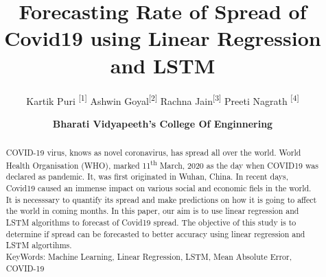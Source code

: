 \documentclass[a4paper]{jpconf}
\begin{document}
\title{Forecasting Rate of Spread of Covid19 using Linear Regression and LSTM}

\author{Kartik Puri \textsuperscript{[1]}
Ashwin Goyal\textsuperscript{[2]}
Rachna Jain\textsuperscript{[3]}
Preeti Nagrath \textsuperscript{[4]} }

\address{1. kartikpuri99@gmail.com; Department of Electronics and Communication Engineering \\
2. ashwingoayl180@gmail.com; Department of Electronics and Communication Engineering \\
3.rachnajain.bvcoe@bvp.edu.in; Department of Computer Science and Engineering \\
4.preeti.nagrath@bharatividyapeeth.edu; Department of Computer Science and Engineering}


\date{\small{\textbf{Bharati
Vidyapeeth's College Of Enginnering} }}



\begin{abstract}
COVID-19 virus, knows as novel coronavirus, has spread all over
the world.  World Health Organisation (WHO), marked
11\textsuperscript{th} March, 2020 as the day when COVID19 was
declared as pandemic. It, was first
originated in Wuhan, China.
In recent days, Covid19 caused an immense impact on various
social and economic fiels in the world.
It is necesssary to
quantify its spread and make predictions on how it is going to
affect the world in coming months.
In this paper, our aim is to use linear
regression and LSTM algorithms to forecast of Covid19 spread.
The objective of this study is to determine if spread can be
forecasted to better accuracy using linear regression and LSTM
algortihms.
	 \\

KeyWords: Machine Learning, Linear Regression, LSTM, Mean
Absolute Error, COVID-19
	\\
\end{abstract}



\pagebreak
\printbibliography
\end{document}
